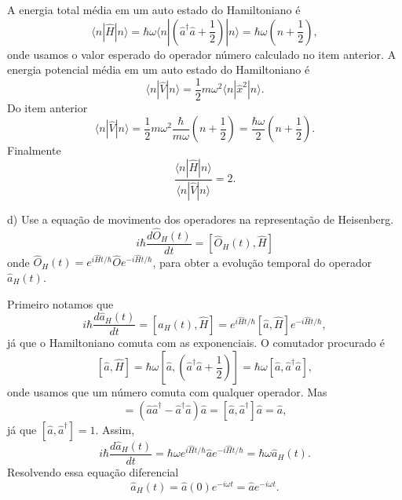 \begin{enumerate}[start=1,label={\bfseries Q\arabic*.}]
\resposta A energia total média em um auto estado do Hamiltoniano é
%
\begin{equation}
  \langle n | \hat{H} | n \rangle = \hbar \omega \langle n | \left( \hat{a}^{\dagger} \hat{a} + \frac{1}{2} \right) | n \rangle = \hbar \omega \left( n + \frac{1}{2} \right) ,
\end{equation}
%
onde usamos o valor esperado do operador número calculado no item anterior. A energia potencial média em um auto estado do Hamiltoniano é
%
\begin{equation}
  \langle n | \hat{V} | n \rangle = \frac{1}{2} m \omega^{2} \langle n | \hat{x}^{2} | n \rangle .
\end{equation}
%
Do item anterior
%
\begin{equation}
  \langle n | \hat{V} | n \rangle = \frac{1}{2} m \omega^{2} \frac{\hbar}{m \omega} \left( n + \frac{1}{2} \right) = \frac{\hbar \omega}{2} \left( n + \frac{1}{2} \right).
\end{equation}
%
Finalmente
%
\begin{equation}
  \frac{\langle n | \hat{H} | n \rangle}{\langle n | \hat{V} | n \rangle} = 2 .
\end{equation}


d) Use a equação de movimento dos operadores na representação de Heisenberg.
$$
i \hbar \frac{d \hat{O}_{H}(t) }{dt} = \left[  \hat{O}_{H} (t), \hat{H}  \right]
$$
onde $\hat{O}_{H} (t) = e^{i\hat{H}t/\hbar} \hat{O} e^{-i\hat{H}t/\hbar}$, para obter a evolução temporal do operador $\hat{a}_{H}(t)$.

\resposta Primeiro notamos que
%
\begin{equation}
  i \hbar \frac{d \hat{a}_{H} (t) }{dt}  =  \left[ \hat{a}_{H} (t), \hat{H}  \right] = e^{i \hat{H} t / \hbar} \left[  \hat{a} , \hat{H}  \right] e^{-i \hat{H} t / \hbar} ,
\end{equation}
%
já que o Hamiltoniano comuta com as exponenciais. O comutador procurado é
%
\begin{equation}
  \left[ \hat{a}, \hat{H} \right] = \hbar \omega \left[ \hat{a}, \left( \hat{a}^{\dagger} \hat{a} + \frac{1}{2} \right)   \right] = \hbar \omega [\hat{a}, \hat{a}^{\dagger} \hat{a}] ,
\end{equation}
%
onde usamos que um número comuta com qualquer operador. Mas
%
\begin{equation}
  [\hat{a}, \hat{a}^{\dagger} \hat{a}] = (\hat{a} \hat{a}^{\dagger} - \hat{a}^{\dagger}\hat{a}) \hat{a} = [\hat{a}, \hat{a}^{\dagger}] \hat{a} = \hat{a} ,
\end{equation}
%
já que $[\hat{a}, \hat{a}^{\dagger}] = 1$. Assim,
%
\begin{equation}
  i \hbar \frac{ d \hat{a}_{H} (t) }{dt} = \hbar \omega e^{i \hat{H} t/ \hbar} \hat{a} e^{-i \hat{H} t/ \hbar} = \hbar \omega \hat{a}_{H} (t) .
\end{equation}
%
Resolvendo essa equação diferencial
%
\begin{equation}
  \hat{a}_{H} (t) = \hat{a} (0) e^{-i \omega t} = \hat{a} e^{-i \omega t} .
\end{equation}
%






\end{enumerate}
